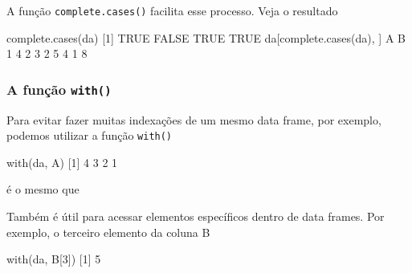 \documentclass[
  10pt,
  a4paper]{book}
\newenvironment{Shaded}{\begin{snugshade}}{\end{snugshade}}
\newcommand{\ConstantTok}[1]{\textcolor[rgb]{0.00,0.00,0.00}{#1}}
\newcommand{\DecValTok}[1]{\textcolor[rgb]{0.00,0.00,0.81}{#1}}
\newcommand{\FunctionTok}[1]{\textcolor[rgb]{0.00,0.00,0.00}{#1}}
\newcommand{\NormalTok}[1]{#1}
\newcommand{\SpecialCharTok}[1]{\textcolor[rgb]{0.00,0.00,0.00}{#1}}
\begin{document}
A função \texttt{complete.cases()} facilita esse processo. Veja o resultado

\begin{Shaded}
\begin{Highlighting}[]
\FunctionTok{complete.cases}\NormalTok{(da)}
\NormalTok{[}\DecValTok{1}\NormalTok{]  }\ConstantTok{TRUE} \ConstantTok{FALSE}  \ConstantTok{TRUE}  \ConstantTok{TRUE}
\NormalTok{da[}\FunctionTok{complete.cases}\NormalTok{(da), ]}
\NormalTok{  A B}
\DecValTok{1} \DecValTok{4} \DecValTok{2}
\DecValTok{3} \DecValTok{2} \DecValTok{5}
\DecValTok{4} \DecValTok{1} \DecValTok{8}
\end{Highlighting}
\end{Shaded}

\hypertarget{a-funuxe7uxe3o-with}{%
\subsubsection{\texorpdfstring{A função \texttt{with()}}{A função with()}}\label{a-funuxe7uxe3o-with}}

Para evitar fazer muitas indexações de um mesmo data frame, por exemplo,
podemos utilizar a função \texttt{with()}

\begin{Shaded}
\begin{Highlighting}[]
\FunctionTok{with}\NormalTok{(da, A)}
\NormalTok{[}\DecValTok{1}\NormalTok{] }\DecValTok{4} \DecValTok{3} \DecValTok{2} \DecValTok{1}
\end{Highlighting}
\end{Shaded}

é o mesmo que

\begin{Shaded}
\end{Shaded}

Também é útil para acessar elementos específicos dentro de data
frames. Por exemplo, o terceiro elemento da coluna B

\begin{Shaded}
\begin{Highlighting}[]
\FunctionTok{with}\NormalTok{(da, B[}\DecValTok{3}\NormalTok{])}
\NormalTok{[}\DecValTok{1}\NormalTok{] }\DecValTok{5}
\end{Highlighting}
\end{Shaded}
\end{document}
